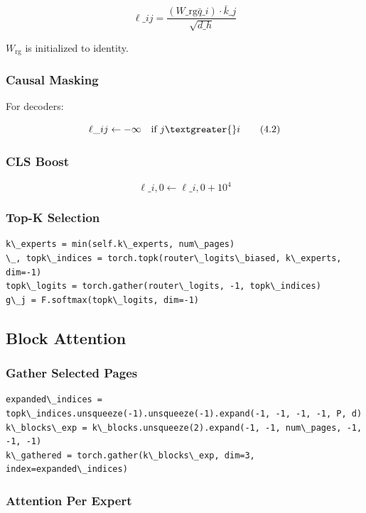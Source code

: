 \[
\ell\_{ij} = \frac{(W\_\text{rg} \bar{q}\_i) \cdot \bar{k}\_j}{\sqrt{d\_h}}
\tag{4.1}
\]

$W_\text{rg}$ is initialized to identity.

\subsubsection{Causal Masking}

For decoders:

\[
\ell\_{ij} \leftarrow -\infty \quad \text{if } j \textgreater{} i
\tag{4.2}
\]

\subsubsection{CLS Boost}

\[
\ell\_{i, 0} \leftarrow \ell\_{i, 0} + 10^4
\tag{4.3}
\]

\subsubsection{Top-K Selection}

\begin{lstlisting}
k\_experts = min(self.k\_experts, num\_pages)
\_, topk\_indices = torch.topk(router\_logits\_biased, k\_experts, dim=-1)
topk\_logits = torch.gather(router\_logits, -1, topk\_indices)
g\_j = F.softmax(topk\_logits, dim=-1)
\end{lstlisting}

\subsection{Block Attention}

\subsubsection{Gather Selected Pages}

\begin{lstlisting}
expanded\_indices = topk\_indices.unsqueeze(-1).unsqueeze(-1).expand(-1, -1, -1, -1, P, d)
k\_blocks\_exp = k\_blocks.unsqueeze(2).expand(-1, -1, num\_pages, -1, -1, -1)
k\_gathered = torch.gather(k\_blocks\_exp, dim=3, index=expanded\_indices)
\end{lstlisting}

\subsubsection{Attention Per Expert}

